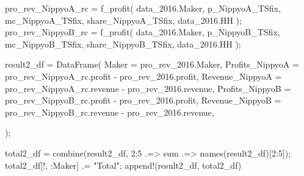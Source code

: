 \documentclass[
  letterpaper,
  DIV=11,
  numbers=noendperiod]{scrreprt}
\newenvironment{Shaded}{\begin{snugshade}}{\end{snugshade}}
\newcommand{\FloatTok}[1]{\textcolor[rgb]{0.68,0.00,0.00}{#1}}
\newcommand{\FunctionTok}[1]{\textcolor[rgb]{0.28,0.35,0.67}{#1}}
\newcommand{\NormalTok}[1]{\textcolor[rgb]{0.00,0.23,0.31}{#1}}
\newcommand{\OperatorTok}[1]{\textcolor[rgb]{0.37,0.37,0.37}{#1}}
\newcommand{\StringTok}[1]{\textcolor[rgb]{0.13,0.47,0.30}{#1}}
\begin{document}
\begin{Shaded}
\begin{Highlighting}[]
\NormalTok{pro\_rev\_NippyoA\_rc }\OperatorTok{=} \FunctionTok{f\_profit}\NormalTok{(}
\NormalTok{    data\_2016.Maker,}
\NormalTok{    p\_NippyoA\_TSfix,}
\NormalTok{    mc\_NippyoA\_TSfix,}
\NormalTok{    share\_NippyoA\_TSfix,}
\NormalTok{    data\_2016.HH}
\NormalTok{);}
\NormalTok{pro\_rev\_NippyoB\_rc }\OperatorTok{=} \FunctionTok{f\_profit}\NormalTok{(}
\NormalTok{    data\_2016.Maker,}
\NormalTok{    p\_NippyoB\_TSfix,}
\NormalTok{    mc\_NippyoB\_TSfix,}
\NormalTok{    share\_NippyoB\_TSfix,}
\NormalTok{    data\_2016.HH}
\NormalTok{);}

\NormalTok{result2\_df }\OperatorTok{=} \FunctionTok{DataFrame}\NormalTok{(}
\NormalTok{    Maker }\OperatorTok{=}\NormalTok{ pro\_rev\_2016.Maker,}
\NormalTok{    Profits\_NippyoA }\OperatorTok{=}\NormalTok{ pro\_rev\_NippyoA\_rc.profit }\OperatorTok{{-}}\NormalTok{ pro\_rev\_2016.profit,}
\NormalTok{    Revenue\_NippyoA }\OperatorTok{=}\NormalTok{ pro\_rev\_NippyoA\_rc.revenue }\OperatorTok{{-}}\NormalTok{ pro\_rev\_2016.revenue,}
\NormalTok{    Profits\_NippyoB }\OperatorTok{=}\NormalTok{ pro\_rev\_NippyoB\_rc.profit }\OperatorTok{{-}}\NormalTok{ pro\_rev\_2016.profit,}
\NormalTok{    Revenue\_NippyoB }\OperatorTok{=}\NormalTok{ pro\_rev\_NippyoB\_rc.revenue }\OperatorTok{{-}}\NormalTok{ pro\_rev\_2016.revenue,}
    
\NormalTok{);}

\NormalTok{total2\_df }\OperatorTok{=} \FunctionTok{combine}\NormalTok{(result2\_df, }\FloatTok{2}\OperatorTok{:}\FloatTok{5} \OperatorTok{.=\textgreater{}}\NormalTok{ sum }\OperatorTok{.=\textgreater{}} \FunctionTok{names}\NormalTok{(result2\_df)[}\FloatTok{2}\OperatorTok{:}\FloatTok{5}\NormalTok{]);}
\NormalTok{total2\_df[!, }\OperatorTok{:}\NormalTok{Maker] }\OperatorTok{.=} \StringTok{"Total"}\NormalTok{;}
\FunctionTok{append!}\NormalTok{(result2\_df, total2\_df)}
\end{Highlighting}
\end{Shaded}
\end{document}
